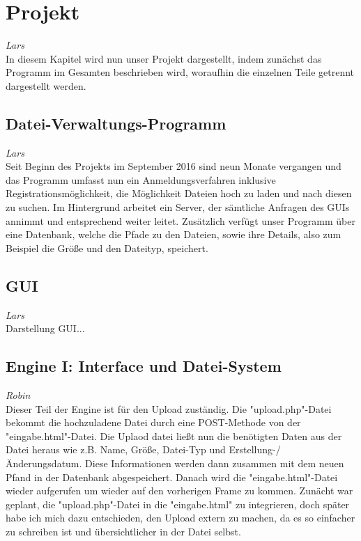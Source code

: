 \documentclass[12pt,a4paper,bibliography=totocnumbered,listof=totocnumbered]{scrartcl}
\begin{document}
\pagebreak

\section{Projekt}
\label{sec:Projekt}
\emph{Lars}\\
In diesem Kapitel wird nun unser Projekt dargestellt, indem zunächst das Programm im Gesamten beschrieben wird, woraufhin die einzelnen Teile getrennt dargestellt werden.

\subsection{Datei-Verwaltungs-Programm}
\emph{Lars}\\
Seit Beginn des Projekts im September 2016 sind neun Monate vergangen und das Programm umfasst nun ein Anmeldungsverfahren inklusive Registrationsmöglichkeit, die Möglichkeit Dateien hoch zu laden und nach diesen zu suchen. Im Hintergrund arbeitet ein Server, der sämtliche Anfragen des GUIs annimmt und entsprechend weiter leitet. Zusätzlich verfügt unser Programm über eine Datenbank, welche die Pfade zu den Dateien, sowie ihre Details, also zum Beispiel die Größe und den Dateityp, speichert.

\subsection{GUI}
\emph{Lars}\\
Darstellung GUI...

\subsection{Engine I: Interface und Datei-System}
\emph{Robin}\\
Dieser Teil der Engine ist für den Upload zuständig. Die "upload.php"-Datei bekommt die hochzuladene Datei durch eine POST-Methode von der "eingabe.html"-Datei. Die Uplaod datei ließt nun die benötigten Daten aus der Datei heraus wie z.B. Name, Größe, Datei-Typ und Erstellung-/Änderungsdatum. Diese Informationen werden dann zusammen mit dem neuen Pfand in der Datenbank abgespeichert. Danach wird die "eingabe.html"-Datei wieder aufgerufen um wieder auf den vorherigen Frame zu kommen.
Zunächt war geplant, die "upload.php"-Datei in die "eingabe.html" zu integrieren, doch später habe ich mich dazu entschieden, den Upload extern zu machen, da es so einfacher zu schreiben ist und übersichtlicher in der Datei selbst.
\end{document}
